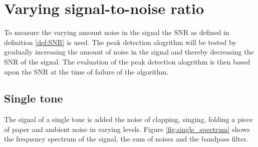 \section{Varying signal-to-noise ratio}
To measure the varying amount noise in the signal the SNR as defined in definition \ref{def:SNR} is used. The peak detection alogrithm will be tested by gradually increasing the amount of noise in the signal and thereby decreasing the SNR of the signal. The evaluation of the peak detection alogrithm is then based upon the SNR at the time of failure of the algorithm.
\subsection{Single tone}
The signal of a single tone is added the noise of clapping, singing, folding a piece of paper and ambient noise in varying levels. Figure \ref{fig:single_spectrum} shows the frequency spectrum of the signal, the sum of noises and the bandpass filter.
